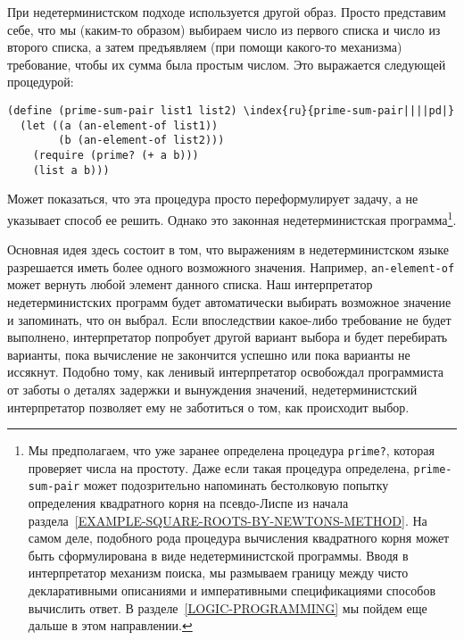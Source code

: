 При 
недетерминистском подходе используется другой
образ.  Просто представим себе, что мы (каким-то образом)
выбираем число из первого списка и число из второго списка, а затем
предъявляем (при помощи какого-то механизма) требование, чтобы их сумма 
была простым числом.  Это выражается следующей процедурой:

\begin{Verbatim}[fontsize=\small]
(define (prime-sum-pair list1 list2) \index{ru}{prime-sum-pair||||pd|}
  (let ((a (an-element-of list1))
        (b (an-element-of list2)))
    (require (prime? (+ a b)))
    (list a b)))
\end{Verbatim}
Может показаться, что эта процедура просто переформулирует задачу, а не
указывает способ ее решить.  Однако это законная недетерминистская
программа\footnote{Мы предполагаем, что уже заранее определена процедура
{\tt prime?}, которая проверяет числа на простоту.  Даже если
такая процедура определена, {\tt prime-sum-pair} может
подозрительно напоминать бестолковую попытку определения
квадратного корня на псевдо-Лиспе из начала 
раздела~\ref{EXAMPLE-SQUARE-ROOTS-BY-NEWTONS-METHOD}.  На самом
деле, подобного рода процедура вычисления квадратного корня может быть
сформулирована в виде недетерминистской программы. 
Вводя в
интерпретатор механизм поиска, мы размываем границу между чисто
декларативными описаниями и императивными спецификациями способов
вычислить ответ.  В разделе~\ref{LOGIC-PROGRAMMING} мы
пойдем еще дальше в этом направлении.}.

Основная идея здесь состоит в том, что выражениям в
недетерминистском языке разрешается иметь более одного возможного значения.
Например, {\tt an-element-of} может вернуть любой элемент
данного списка.  Наш интерпретатор недетерминистских программ будет
автоматически выбирать возможное значение и запоминать, что он выбрал.
Если впоследствии какое-либо требование не будет выполнено,
интерпретатор попробует другой вариант выбора и будет перебирать варианты,
пока вычисление не закончится успешно или пока варианты не иссякнут.
Подобно тому, как ленивый интерпретатор освобождал
программиста от заботы о деталях задержки и
вынуждения значений, недетерминистский интерпретатор позволяет ему
не заботиться о том, как происходит выбор.

